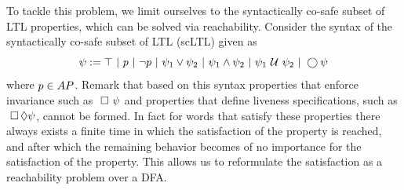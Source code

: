 \documentclass{ifacconf}
\newcommand{\red}[1]{{\color{red} #1}}
\newcommand{\new}[1]{{\color{blue}#1}}
\begin{document}
To tackle this problem, we limit ourselves to the syntactically co-safe subset of LTL properties, which can be solved via reachability.  %
Consider the syntax of the syntactically co-safe subset of LTL (scLTL) given as
    \begin{equation}\label{eq:scLTL}
     \psi :=  \True \ |\ p \ |\ \notltl p \ |\ \psi_1 \vee\psi_2  \ |\ \psi_1 \andltl \psi_2 \ |\ \psi_1 \Until \psi_2 \ |\ \Next \psi
    \end{equation}     where $p\in {AP}$.
\new{ Remark that based on this syntax properties that enforce invariance such as $\ \square\ \psi$ and properties that define liveness specifications, such as $\ \square\ \!\lozenge \psi$, cannot be formed.  } \new{In fact for words that satisfy these properties there always exists a finite time in which the satisfaction of the property is reached, and after which the remaining behavior becomes of no importance for the satisfaction of the property.  This allows us to reformulate the satisfaction as a reachability problem over a DFA. %
}
% 
\end{document}
